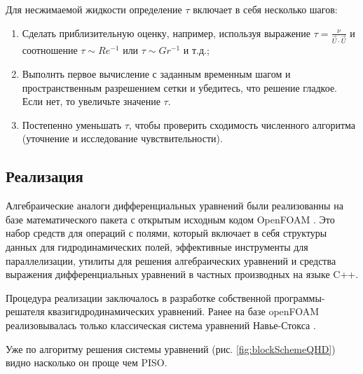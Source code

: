 Для несжимаемой жидкости определение $\tau$ включает в себя несколько шагов:

\begin{enumerate}
     \item Сделать приблизительную оценку, например, используя выражение $\tau = \frac{\nu}{\vec{U} \cdot \vec{U}}$ и соотношение $ \tau \sim Re^{-1} $ или $ \tau \sim Gr^{-1} $ и т.д.;
     \item Выполнть первое вычисление с заданным временным шагом и пространственным разрешением сетки и убедитесь, что решение гладкое. Если нет, то увеличьте значение $\tau $.
     \item Постепенно уменьшать $\tau$, чтобы проверить сходимость численного алгоритма (уточнение и исследование чувствительности).
\end{enumerate} 

\subsection{Реализация}

Алгебраические аналоги дифференциальных уравнений были реализованны на базе математического пакета с открытым исходным кодом OpenFOAM \cite{OpenFOAM}. Это набор средств для операций с полями, который включает в себя структуры данных для гидродинамических полей, эффективные инструменты для параллелизации, утилиты для решения алгебраических уравнений и средства выражения дифференциальных уравнений в частных производных на языке C++. 

Процедура реализации заключалось в разработке собственной программы-решателя квазигидродинамических уравнений. Ранее на базе openFOAM реализовывалась только классическая система уравнений Навье-Стокса \cite{PericCFDLecture}. 

Уже по алгоритму решения системы уравнений (рис. \ref{fig:blockSchemeQHD}) видно насколько он проще чем PISO. 

